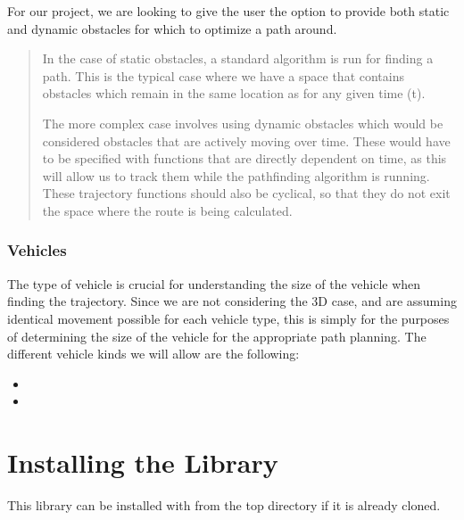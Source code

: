 \documentclass[letterpaper,10pt,english]{sphinxmanual}
\begin{document}
\sphinxAtStartPar
For our project, we are looking to give the user the option to provide both static and dynamic obstacles for which to optimize a path around.
\begin{quote}

\sphinxAtStartPar
{}

\sphinxAtStartPar
In the case of static obstacles, a standard algorithm is run for finding a path. This is the typical case where we have a space that contains obstacles which remain in the same location as for any given time (t).

\sphinxAtStartPar
{}

\sphinxAtStartPar
The more complex case involves using dynamic obstacles which would be considered obstacles that are actively moving over time. These would have to be specified with functions that are directly dependent on time, as this will allow us to track them while the path\sphinxhyphen{}finding algorithm is running. These trajectory functions should also be cyclical, so that they do not exit the space where the route is being calculated.
\end{quote}


\subsubsection{Vehicles}
\label{\detokenize{background_science:vehicles}}
\sphinxAtStartPar
The type of vehicle is crucial for understanding the size of the vehicle when finding the trajectory. Since we are not considering the 3\sphinxhyphen{}D case, and are assuming identical movement possible for each vehicle type, this is simply for the purposes of determining the size of the vehicle for the appropriate path planning. The different vehicle kinds we will allow are the following:
\begin{itemize}
\item {} 
\sphinxAtStartPar
{}

\item {} 
\sphinxAtStartPar
{}

\end{itemize}


\section{Installing the Library}
\label{\detokenize{installation_setup:installing-the-library}}\label{\detokenize{installation_setup::doc}}
\sphinxAtStartPar
This library can be installed with  from the
top directory if it is already cloned.
\end{document}
